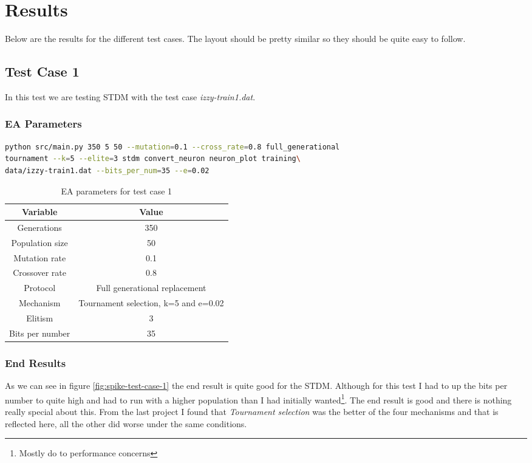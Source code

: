 \section{Results}\label{sec:results}
Below are the results for the different test cases. The layout should be pretty
similar so they should be quite easy to follow.

\subsection{Test Case 1}\label{sec:test-case-1}
In this test we are testing STDM with the test case
\textit{izzy-train1.dat}.
\subsubsection{EA Parameters}\label{sec:test-case-1-parameters}
\begin{lstlisting}[frame=single, language=bash, caption=Command-line to
replicate the results]
python src/main.py 350 5 50 --mutation=0.1 --cross_rate=0.8 full_generational
tournament --k=5 --elite=3 stdm convert_neuron neuron_plot training\
data/izzy-train1.dat --bits_per_num=35 --e=0.02
\end{lstlisting}
\begin{table}[h]
	\begin{tabular}{c c}
		Variable & Value \\
		\hline
		Generations & 350 \\
		\hline
		Population size & 50 \\
		\hline
		Mutation rate & 0.1 \\
		\hline
		Crossover rate & 0.8 \\
		\hline
		Protocol & Full generational replacement \\
		\hline
		Mechanism & Tournament selection, k=5 and e=0.02 \\
		\hline
		Elitism & 3 \\
		\hline
		Bits per number & 35 \\
	\end{tabular}
	\caption{EA parameters for test case 1}
\end{table}
\subsubsection{End Results}\label{sec:test-case-1-results}
As we can see in figure \ref{fig:spike-test-case-1} the end result is quite good
for the STDM. Although for this test I had to up the bits per number to quite
high and had to run with a higher population than I had initially
wanted\footnote{Mostly do to performance concerns}. The end result is good and
there is nothing really special about this. From the last project I found that
\textit{Tournament selection} was the better of the four mechanisms and that is
reflected here, all the other did worse under the same conditions.

